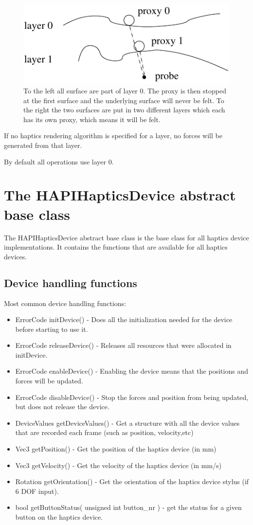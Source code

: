 \begin{figure} 
  \centering 
  \includegraphics{images/layering.pdf}
  \caption{To the left all surface are part of layer 0. The proxy is then stopped at the first surface and the
underlying surface will never be felt. To the right the two surfaces are put in two different layers which
each has its own proxy, which means it will be felt.} 
  \label{Layering_fig} 
\end{figure}

If no haptics rendering algorithm is specified for a layer, no forces
will be generated from that layer.
 
By default all operations use layer 0.

\section{The HAPIHapticsDevice abstract base class}
The HAPIHapticsDevice abstract base class is the base class for all
haptics device implementations. It contains the functions that are
available for all haptics devices.  

\subsection{Device handling functions}

Most common device handling functions:

\begin{itemize}
\item ErrorCode initDevice() -  Does all the initialization needed for the
device before starting to use it.
\item ErrorCode releaseDevice() - Releases all resources that were allocated
in initDevice.
\item ErrorCode enableDevice() - Enabling the device means that the
positions and forces will be updated.  
\item ErrorCode disableDevice() - Stop the forces and position
from being updated, but does not release the device.
\item DeviceValues getDeviceValues() - Get a structure with all the
  device values that are recorded each frame (such as position,
  velocity,etc)
\item Vec3 getPosition() - Get the position of the haptics device (in
  mm)
\item Vec3 getVelocity() - Get the velocity of the haptics device (in
  mm/s)
\item Rotation getOrientation() - Get the orientation of the haptics
  device stylus (if 6 DOF input).
\item bool getButtonStatus( unsigned int button\_nr ) - get the status
  for a given button on the haptics device.
\end{itemize}

